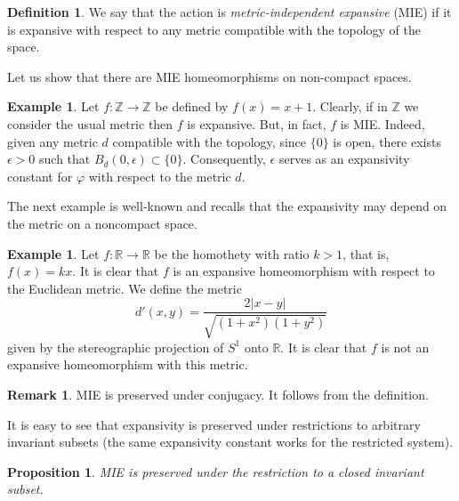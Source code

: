\documentclass[12pt]{amsart}
\newcommand{\R}{\mathbb R}
\newcommand{\Z}{\mathbb Z}
\newcommand{\abs}[1]{\left| #1 \right|}
\theoremstyle{plain}
\newtheorem{proposition}[theorem]{Proposition}
\theoremstyle{definition}
\newtheorem{definition}[theorem]{Definition}
\newtheorem{remark}[theorem]{Remark}
\newtheorem{example}[theorem]{Example}
\theoremstyle{remark}
\providecommand{\abs}[1]{\lvert#1\rvert}
\begin{document}
\begin{definition} \label{DefMet_Ind}
 We say that the action is \emph{metric-independent expansive}  (MIE) if it is expansive with respect to any metric compatible with the topology of the space.
%
\end{definition}

Let us show that there are MIE homeomorphisms on non-compact spaces.

\begin{example}\label{ejemplo1}
Let $f : \Z \rightarrow \Z$ be defined by $f(x) = x + 1$. Clearly, if in $\Z$ we consider the usual metric then $f$ is expansive. 
But, in fact, $f$ is MIE.
Indeed, given any metric $d$ compatible with the topology, since $\{0\}$ is open, there exists $\epsilon > 0$ such that $B_d(0, \epsilon) \subset \{0\}$. Consequently, $\epsilon$ serves as an expansivity constant for $\varphi$ with respect to the metric $d$.
\end{example}

The next example is well-known and recalls that the expansivity may depend on the metric on a noncompact space.

\begin{example} \label{ejemplo2} 
Let $f : \R \rightarrow \R$ be the homothety with ratio $k > 1$, that is, $f(x) = kx$. It is clear that $f$ is an expansive homeomorphism with respect to the Euclidean metric. We define the metric 
\[
d'(x,y) = \dfrac{2\abs{x-y}}{\sqrt{(1 + x^2)(1 + y^2)}}
\]
given by the stereographic projection of $S^1$ onto $\R$. It is clear that $f$ is not an expansive homeomorphism with this metric.
\end{example}





\begin{remark}
MIE is preserved under conjugacy. It follows from the definition.
\end{remark}

It is easy to see that expansivity is preserved under restrictions to arbitrary invariant subsets (the same expansivity constant works for the restricted system).

\begin{proposition}\label{PreservMIE}
MIE is preserved under the restriction to a closed invariant subset.
\end{proposition}
\end{document}
